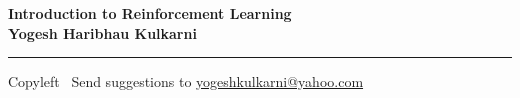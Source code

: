 
\graphicspath{{images/}}

\footnotesize


\begin{center}
\Large{\textbf{Introduction to Reinforcement Learning\\ Yogesh Haribhau Kulkarni}}  
\end{center}

\begin{multicols}{2}

\end{multicols}

\rule{\linewidth}{0.25pt}
\scriptsize
Copyleft \textcopyleft\  Send suggestions to 
\href{http://www.yogeshkulkarni.com}{yogeshkulkarni@yahoo.com}


